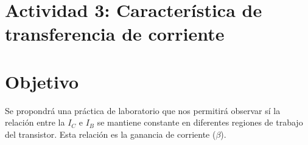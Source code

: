\newpage

\section{Actividad 3: Característica de transferencia de corriente}

\section*{Objetivo}
Se propondrá una práctica de laboratorio que nos permitirá observar sí la relación
entre la $I_C$ e $I_B$ se mantiene constante en diferentes regiones de trabajo del transistor. Esta
relación es la ganancia de corriente ($\beta$).

